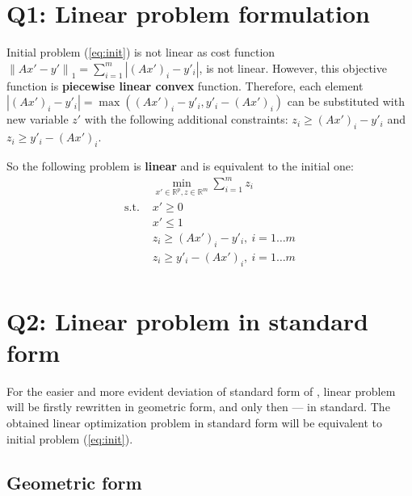 \documentclass{article}
\def\R{\mathbb{R}}
\begin{document}
\section{Q1: Linear problem formulation}
Initial problem (\cref{eq:init}) is not linear as cost function
$ {\| Ax'-y' \|}_1 = \sum_{i=1}^{m} |{(Ax')}_i-y'_i|$, is not linear. However, this objective function is \textbf{piecewise linear convex} function. Therefore, each element $|{(Ax')}_i-y'_i| = \max({(Ax')}_i-y'_i, y'_i -{(Ax')}_i)$ can be substituted with new variable $z'$ with the following additional
constraints: $z_i \geq {(Ax')}_i-y'_i$ and $z_i \geq y'_i-{(Ax')}_i$.

So the following problem is \textbf{linear} and is equivalent to the initial one:
\begin{equation}\label{eq:linear}
  \begin{aligned}
                 & \min\limits_{x' \in \R^p, z \in \R^m} \sum_{i=1}^{m} z_i \\
    \text{s.t. } & x' \geq 0                                                \\
                 & x' \leq 1                                                \\
                 & z_i \geq {(Ax')}_i-y'_i, \ i = 1 \dots m                 \\
                 & z_i \geq y'_i-{(Ax')}_i, \ i = 1 \dots m                 \\
  \end{aligned}
\end{equation}

\section{Q2: Linear problem in standard form}

For the easier and more evident deviation of standard form of ,
linear problem will be firstly rewritten in geometric form, and only then --- in standard. The obtained linear optimization problem in standard form will be equivalent to initial problem (\cref{eq:init}).

\subsection{Geometric form}\label{sec:geom}
\end{document}
